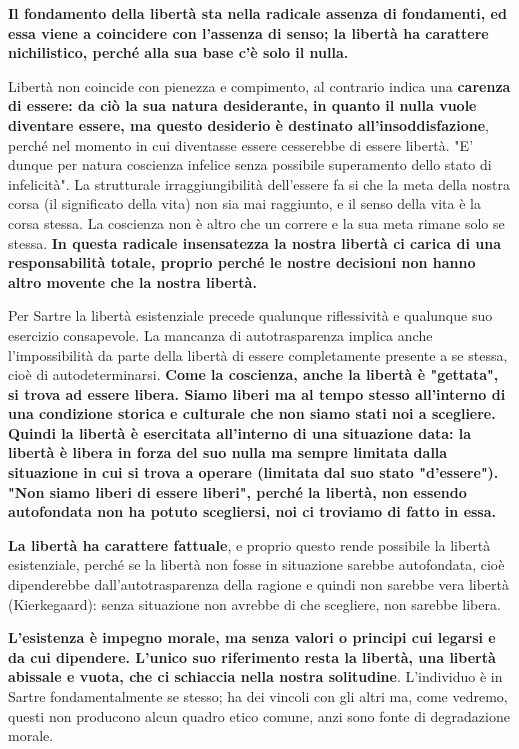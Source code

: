 \textbf{Il fondamento della libertà sta nella radicale
assenza di fondamenti, ed essa viene a coincidere
con l'assenza di senso; la libertà ha
carattere nichilistico, perché alla sua base
c'è solo il nulla.}

Libertà non coincide con pienezza e compimento,
al contrario indica una \textbf{carenza di essere: da ciò
la sua natura desiderante, in quanto il nulla vuole diventare
essere, ma questo desiderio è destinato all'insoddisfazione}, perché nel momento in cui diventasse
essere cesserebbe di essere libertà. "E' dunque
per natura coscienza infelice senza possibile
superamento dello stato di infelicità".
La strutturale irraggiungibilità dell'essere fa si che
la meta della nostra corsa (il significato della vita)
non sia mai raggiunto, e il senso della vita
è la corsa stessa. La coscienza non è altro
che un correre e la sua meta rimane solo se
stessa.
\textbf{In questa radicale insensatezza la nostra libertà
ci carica di una responsabilità totale, proprio
perché le nostre decisioni non hanno altro movente
che la nostra libertà. }

Per Sartre la libertà
esistenziale precede qualunque riflessività e qualunque
suo esercizio consapevole.
La mancanza di autotrasparenza implica anche
l'impossibilità da parte della libertà di essere
completamente presente a se stessa, cioè di
autodeterminarsi. \textbf{Come la coscienza, anche la
libertà è "gettata", si trova ad essere libera.
Siamo liberi ma al tempo stesso all'interno
di una condizione storica e culturale che non
siamo stati noi a scegliere. Quindi la libertà
è esercitata all'interno di una situazione
data: la libertà è libera in forza del suo
nulla ma sempre limitata dalla situazione in
cui si trova a operare (limitata dal suo stato "d'essere").
"Non siamo liberi di essere liberi", perché la
libertà, non essendo autofondata non ha potuto
scegliersi, noi ci troviamo di fatto in essa.}

\textbf{La libertà ha carattere fattuale}, e proprio questo
rende possibile la libertà esistenziale, perché se
la libertà non fosse in situazione sarebbe
autofondata, cioè dipenderebbe dall'autotrasparenza
della ragione e quindi non sarebbe vera libertà (Kierkegaard): senza situazione non avrebbe di che scegliere, non sarebbe libera.

\textbf{L'esistenza è impegno morale, ma senza valori
o principi cui legarsi e da cui dipendere.
L'unico suo riferimento resta la libertà, una
libertà abissale e vuota, che ci schiaccia nella nostra
solitudine}. L'individuo è in Sartre
fondamentalmente se stesso; ha dei vincoli con gli
altri ma, come vedremo, questi non producono
alcun quadro etico comune, anzi sono fonte
di degradazione morale.

